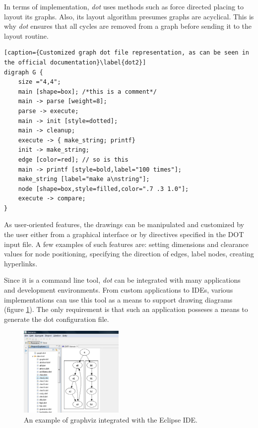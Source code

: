 In terms of implementation, \emph{dot} uses methods such as force directed placing to layout its graphs. Also, its 
layout algorithm presumes graphs are acyclical. This is why \emph{dot} ensures that all cycles are removed from a graph 
before sending it to the layout routine. 

\begin{lstlisting}[caption={Customized graph dot file representation, as can be seen in the official documentation}\label{dot2}]
digraph G {
	size ="4,4";
	main [shape=box]; /*this is a comment*/
	main -> parse [weight=8];
	parse -> execute;
	main -> init [style=dotted];
	main -> cleanup;
	execute -> { make_string; printf}
	init -> make_string;
	edge [color=red]; // so is this
	main -> printf [style=bold,label="100 times"];
	make_string [label="make a\nstring"];
	node [shape=box,style=filled,color=".7 .3 1.0"];
	execute -> compare;
}
\end{lstlisting}

As user-oriented features, the drawings can be manipulated and customized by the user either from a graphical 
interface or by directives specified in the DOT input file. A few examples of such features are: setting dimensions 
and clearance values for node positioning, specifying the direction of edges, label nodes, creating hyperlinks.

Since it is a command line tool, \emph{dot} can be integrated with many applications and development environments. From 
custom applications to IDEs, various implementations can use this tool as a means to support drawing diagrams (figure \ref{dotide}). The 
only requirement is that such an application posseses a means to generate the dot configuration file.

\begin{figure}[ht] \centering
\includegraphics[width=0.45\textwidth]{img/relatedwork/graphviz.png}
\caption{An example of graphviz integrated with the Eclipse IDE.\protect\footnotemark \label{dotide}} \end{figure}

